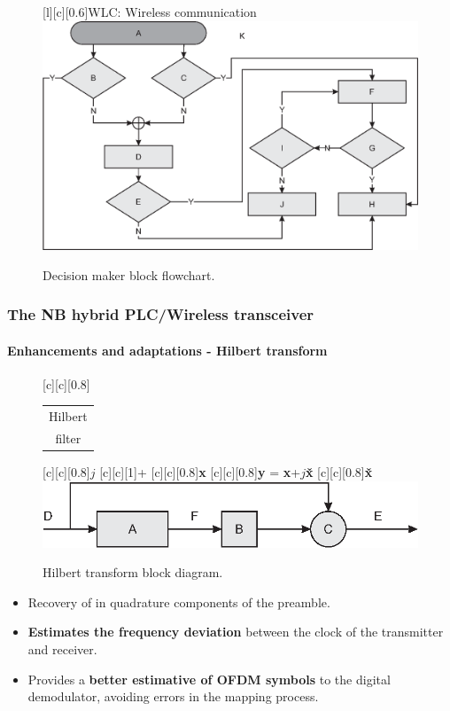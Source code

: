 \documentclass[mathserif]{beamer}
\newcommand{\wait}{\vfill}
\begin{document}
\begin{frame}
\begin{figure}[ht]
		[0.6]{WLC: Wireless communication}
		\centering
		\includegraphics[width=0.85\linewidth]{figuras/decision2}
		\caption{Decision maker block flowchart.}
		\label{fig:decision}
	\end{figure}
\end{frame}

\begin{frame}
	\frametitle{The NB hybrid PLC/Wireless transceiver}
	\framesubtitle{Enhancements and adaptations - Hilbert transform}
	\renewcommand{\sizeLetter}{0.8}
	\begin{figure}[h]
		[\sizeLetter]{\begin{tabular}{@{}c@{}}
				Hilbert\\ 
				filter\\ 
		\end{tabular} }
		[\sizeLetter]{$j$}
		[1]{+}
		[\sizeLetter]{\textbf{x}}
		[\sizeLetter]{\textbf{y} = \textbf{x}+$j$\textbf{\v{x}}}
		[\sizeLetter]{\textbf{\v{x}}}
		\centering
		\includegraphics[width=0.7\linewidth]{figuras/hilbert}
		\caption{Hilbert transform block diagram.}
		\label{fig:hilbert}
	\end{figure}
	\wait
	\begin{itemize}
		\item Recovery of in quadrature components of the preamble. \wait
		\item \textbf{Estimates the frequency deviation} between the clock of the transmitter and receiver. \wait
		\item Provides a \textbf{better estimative of OFDM symbols} to the digital
		demodulator, avoiding errors in the mapping process.
	\end{itemize}
\end{frame}
\end{document}
